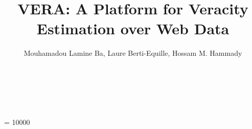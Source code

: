 \documentclass{sig-alternate}
\begin{document}
 \widowpenalty = 10000



\title{VERA: A Platform for Veracity Estimation over Web Data}


\author{
\alignauthor
Mouhamadou Lamine Ba, Laure Berti-Equille, Hossam M. Hammady\\
       \\
       \\
       \\
}

\maketitle
\end{document}
